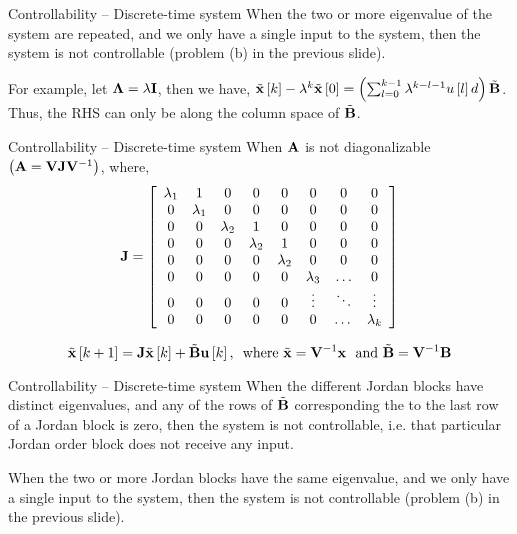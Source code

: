 \documentclass[aspectratio=169]{beamer}
\def\mf{\ensuremath\mathbf}
\def\lp{\ensuremath\left(}
\def\rp{\ensuremath\right)}
\def\ls{\ensuremath\left[}
\def\rs{\ensuremath\right]}
\newcommand{\ct}[1]{\lp #1\rp}
\newcommand{\dt}[1]{\ls #1\rs}
\begin{document}
\begin{frame}{Controllability -- Discrete-time system}
When the two or more eigenvalue of the system are repeated, and we only have a single input to the system, then the system is not controllable (problem (b) in the previous slide).

For example, let $\mf{\Lambda} = \lambda \mf{I}$, then we have, $\tilde{\mf{x}}\dt{k} - \lambda^k\tilde{\mf{x}}\dt{0} =  \ct{\sum_{l=0}^{k-1} \lambda^{k-l-1}u\dt{l}d}\tilde{\mf{B}}$. Thus, the RHS can only be along the column space of $\tilde{\mf{B}}$.
\end{frame}


\begin{frame}{Controllability -- Discrete-time system}
When $\mf{A}$ is not diagonalizable $\ct{\mf{A} = \mf{V}\mf{J}\mf{V}^{-1}}$, where,
\[ \mf{J} = \left[
\begin{array}{cccccccc}
\lambda_1 & 1 & 0 & 0 & 0 & 0 & 0 & 0 \\
0 & \lambda_1 & 0 & 0 & 0 & 0 & 0 & 0 \\
0 & 0 & \lambda_2 & 1 & 0 & 0 & 0 & 0 \\
0 & 0 & 0 & \lambda_2 & 1 & 0 & 0 & 0 \\
0 & 0 & 0 & 0 & \lambda_2 & 0 & 0 & 0 \\
0 & 0 & 0 & 0 & 0 & \lambda_3 & \ldots & 0 \\
0 & 0 & 0 & 0 & 0 & \vdots & \ddots & \vdots \\
0 & 0 & 0 & 0 & 0 & 0 & \dots & \lambda_k
\end{array}
\right]
\]

\[ \tilde{\mf{x}}\dt{k+1} = \mf{J}\tilde{\mf{x}}\dt{k} + \tilde{\mf{B}}\mf{u}\dt{k}, \,\,\,\text{where } \tilde{\mf{x}} = \mf{V}^{-1}\mf{x} \,\, \text{ and } \tilde{\mf{B}} = \mf{V}^{-1}\mf{B} \]
\end{frame}


\begin{frame}[t]{Controllability -- Discrete-time system}
When the different Jordan blocks have distinct eigenvalues, and any of the rows of $\tilde{\mf{B}}$ corresponding the to the last row of a Jordan block is zero, then the system is not controllable, i.e. that particular Jordan order block does not receive any input.
\vspace{0.5cm}

When the two or more Jordan blocks have the same eigenvalue, and we only have a single input to the system, then the system is not controllable (problem (b) in the previous slide).
\end{frame}
\end{document}
